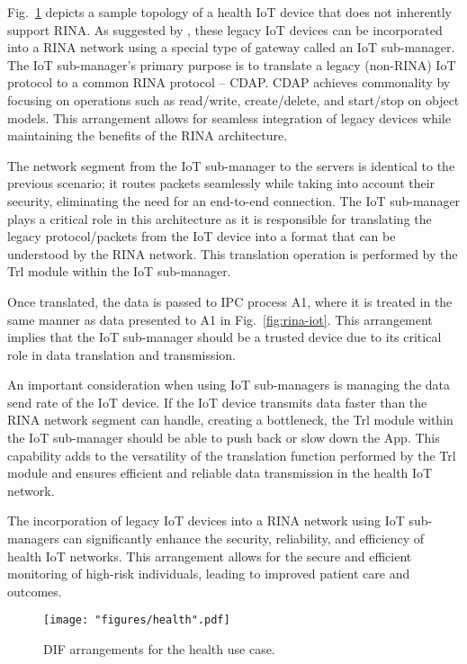 \documentclass{ieeeaccess}
\begin{document}
Fig.~\ref{fig:rina-health} depicts a sample topology of a health IoT device that does not inherently support RINA. As suggested by \cite{maryan2020}, these legacy IoT devices can be incorporated into a RINA network using a special type of gateway called an IoT sub-manager. The IoT sub-manager's primary purpose is to translate a legacy (non-RINA) IoT protocol to a common RINA protocol – CDAP. CDAP achieves commonality by focusing on operations such as read/write, create/delete, and start/stop on object models. This arrangement allows for seamless integration of legacy devices while maintaining the benefits of the RINA architecture.

The network segment from the IoT sub-manager to the servers is identical to the previous scenario; it routes packets seamlessly while taking into account their security, eliminating the need for an end-to-end connection. The IoT sub-manager plays a critical role in this architecture as it is responsible for translating the legacy protocol/packets from the IoT device into a format that can be understood by the RINA network. This translation operation is performed by the Trl module within the IoT sub-manager.

Once translated, the data is passed to IPC process A1, where it is treated in the same manner as data presented to A1 in Fig.~\ref{fig:rina-iot}. This arrangement implies that the IoT sub-manager should be a trusted device due to its critical role in data translation and transmission.

An important consideration when using IoT sub-managers is managing the data send rate of the IoT device. If the IoT device transmits data faster than the RINA network segment can handle, creating a bottleneck, the Trl module within the IoT sub-manager should be able to push back or slow down the App. This capability adds to the versatility of the translation function performed by the Trl module and ensures efficient and reliable data transmission in the health IoT network.

The incorporation of legacy IoT devices into a RINA network using IoT sub-managers can significantly enhance the security, reliability, and efficiency of health IoT networks. This arrangement allows for the secure and efficient monitoring of high-risk individuals, leading to improved patient care and outcomes.


\begin{figure}[!t]
	\centering
	\texttt{[image: "figures/health".pdf]}
	\caption{DIF arrangements for the health use case.}
	\label{fig:rina-health}
\end{figure}
\end{document}
